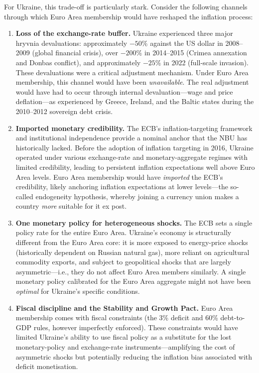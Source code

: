 \documentclass[11pt,a4paper]{article}
\begin{document}
For Ukraine, this trade-off is particularly stark. Consider the following
channels through which Euro Area membership would have reshaped the inflation
process:

\begin{enumerate}[leftmargin=2em]

  \item \textbf{Loss of the exchange-rate buffer.}
  Ukraine experienced three major hryvnia devaluations: approximately $-50\%$
  against the US dollar in 2008--2009 (global financial crisis), over $-200\%$
  in 2014--2015 (Crimea annexation and Donbas conflict), and approximately
  $-25\%$ in 2022 (full-scale invasion). These devaluations were a critical
  adjustment mechanism. Under Euro Area membership, this channel would have been
  \emph{unavailable}. The real adjustment would have had to occur through
  internal devaluation---wage and price deflation---as experienced by Greece,
  Ireland, and the Baltic states during the 2010--2012 sovereign debt crisis.

  \item \textbf{Imported monetary credibility.}
  The ECB's inflation-targeting framework and institutional independence provide
  a nominal anchor that the NBU has historically lacked. Before the adoption of
  inflation targeting in 2016, Ukraine operated under various exchange-rate and
  monetary-aggregate regimes with limited credibility, leading to persistent
  inflation expectations well above Euro Area levels. Euro Area membership would
  have \emph{imported} the ECB's credibility, likely anchoring inflation
  expectations at lower levels---the so-called \citet{frankel_rose1998}
  endogeneity hypothesis, whereby joining a currency union makes a country
  \emph{more} suitable for it ex post.

  \item \textbf{One monetary policy for heterogeneous shocks.}
  The ECB sets a single policy rate for the entire Euro Area. Ukraine's economy
  is structurally different from the Euro Area core: it is more exposed to
  energy-price shocks (historically dependent on Russian natural gas), more
  reliant on agricultural commodity exports, and subject to geopolitical shocks
  that are largely asymmetric---i.e., they do not affect Euro Area members
  similarly. A single monetary policy calibrated for the Euro Area aggregate
  might not have been \textit{optimal} for Ukraine's specific
  conditions.

  \item \textbf{Fiscal discipline and the Stability and Growth Pact.}
  Euro Area membership comes with fiscal constraints (the 3\% deficit and 60\%
  debt-to-GDP rules, however imperfectly enforced). These constraints would have
  limited Ukraine's ability to use fiscal policy as a substitute for the lost
  monetary-policy and exchange-rate instruments---amplifying the cost of
  asymmetric shocks but potentially reducing the inflation bias associated with
  deficit monetisation.


\end{enumerate}
\end{document}
